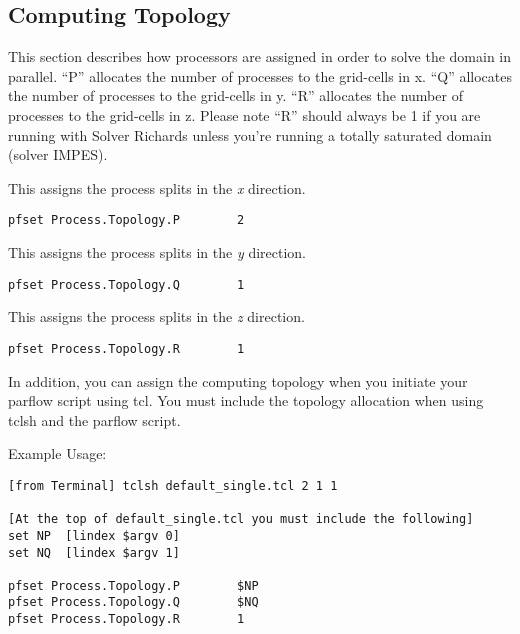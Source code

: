 \subsection{Computing Topology}
\label{Computing Topology}

This section describes how processors are assigned in order to solve the domain
in parallel. “P” allocates the number of processes to the grid-cells in x. “Q” allocates
the number of processes to the grid-cells in y. “R” allocates the number of processes to
the grid-cells in z. Please note “R” should always be 1 if you are running with Solver
Richards \cite{Jones-Woodward01} unless you’re running a totally saturated domain (solver
IMPES).

{This assigns the process splits in the \emph{x} direction.}
\begin{display}\begin{verbatim}
pfset Process.Topology.P        2
\end{verbatim}\end{display}

{This assigns the process splits in the \emph{y} direction.}
\begin{display}\begin{verbatim}
pfset Process.Topology.Q        1
\end{verbatim}\end{display}

{This assigns the process splits in the \emph{z} direction.}
\begin{display}\begin{verbatim}
pfset Process.Topology.R        1
\end{verbatim}\end{display}

In addition, you can assign the computing topology when you initiate your parflow script using tcl.
You must include the topology allocation when using tclsh and the parflow script.

Example Usage: \begin{verbatim}
[from Terminal] tclsh default_single.tcl 2 1 1

[At the top of default_single.tcl you must include the following]
set NP  [lindex $argv 0]
set NQ  [lindex $argv 1]

pfset Process.Topology.P        $NP
pfset Process.Topology.Q        $NQ
pfset Process.Topology.R        1 \end{verbatim}

